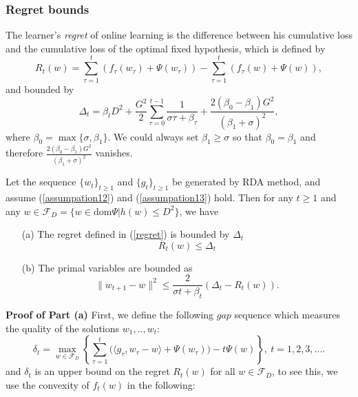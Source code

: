 \subsubsection{Regret bounds}
The learner's \emph{regret} of online learning is the difference between his cumulative loss and the cumulative loss of the optimal fixed hypothesis, which is defined by
\begin{equation}\label{regret}
	R_t(w)=\sum_{\tau=1}^{t}(f_{\tau}(w_{\tau})+\Psi(w_{\tau})) - \sum_{\tau=1}^{t}(f_{\tau}(w)+\Psi(w)),
\end{equation}
and bounded by
\begin{equation}
	\Delta_t = \beta_t D^2 +\frac{G^2}{2}\sum\limits_{\tau=0}^{t-1}\frac{1}{\sigma\tau+\beta_\tau}+
	\frac{2(\beta_0 -\beta_1)G^2}{(\beta_1+\sigma)^2},
\end{equation}
where $\beta_0=\max\{\sigma, \beta_1\}$. We could always set $\beta_1\geq \sigma$ so that $\beta_0=\beta_1$ and therefore $\frac{2(\beta_0 -\beta_1)G^2}{(\beta_1+\sigma)^2}$ vanishes.
\begin{lemma}\label{lemma_regret}
	Let the sequence $\{w_t\}_{t\geq 1}$ and $\{g_t\}_{t\geq 1}$ be generated by RDA method, and assume (\ref{assumpation12}) and (\ref{assumpation13}) hold. Then for any $t\geq 1$ and any $w\in \mathcal{F}_D=\{w\in\text{dom}\Psi|h(w)\leq D^2\}$, we have
	\begin{itemize}
		\item [(a)] The regret defined in (\ref{regret}) is bounded by $\Delta_t$
		\begin{equation}
			R_t(w)\leq \Delta_t
		\end{equation}
		\item [(b)] The primal variables are bounded as
		\begin{equation}
			\|w_{t+1}-w\|^2\leq \frac{2}{\sigma t+\beta_t}(\Delta_t-R_t(w)).
		\end{equation}
	\end{itemize}
\end{lemma}
\textbf{Proof of Part (a)} First, we define the following $gap$ sequence which measures the quality of the solutions $w_1,..,w_t$:
\begin{equation}\label{52}
	\delta_t = \max\limits_{w\in \mathcal{F}_D} \left\{ \sum\limits_{\tau=1}^{t} 
	\big( \langle g_{\tau},w_{\tau}-w \rangle  + \Psi(w_{\tau}) \big) - t \Psi(w)\right\},~
	t=1,2,3,....
\end{equation}
and $\delta_t$ is an upper bound on the regret $R_t(w)$ for all $w\in \mathcal{F}_D$, to see this, we use the convexity of $f_t(w)$ in the following:
